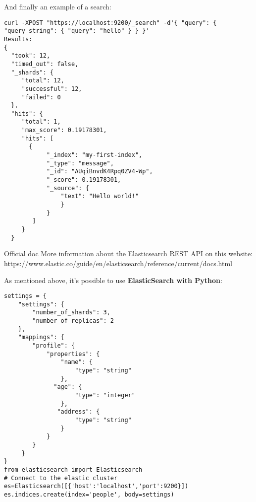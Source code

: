 \documentclass{beamer}[10pt, usepdftitle=false handout]
\begin{document}
\begin{frame}[fragile]
And finally an example of a search:
\vspace*{0.6em}

\begingroup
\fontsize{6pt}{6pt}\selectfont
\begin{verbatim}
curl -XPOST "https://localhost:9200/_search" -d'{ "query": { "query_string": { "query": "hello" } } }'  
Results:
{
  "took": 12,
  "timed_out": false,
  "_shards": {
     "total": 12,
     "successful": 12,
     "failed": 0
  },
  "hits": {
     "total": 1,
     "max_score": 0.19178301,
     "hits": [
       {
            "_index": "my-first-index",
            "_type": "message",
            "_id": "AUqiBnvdK4Rpq0ZV4-Wp",
            "_score": 0.19178301,
            "_source": {
                "text": "Hello world!"
                }
            }
        ]
     }
  }
\end{verbatim}
\endgroup
\begin{block}{Official doc}
More information about the Elasticsearch REST API on this website:
https://www.elastic.co/guide/en/elasticsearch/reference/current/docs.html
\end{block}
\end{frame}
\begin{frame}[fragile]
As mentioned above, it's possible to use \textbf{ElasticSearch with Python}:
\vspace*{0.6em}

\begingroup
\fontsize{6pt}{8pt}\selectfont
\begin{verbatim}
settings = {
    "settings": {
        "number_of_shards": 3,
        "number_of_replicas": 2
    },
    "mappings": {
        "profile": {
            "properties": {
                "name": {
                    "type": "string"
                },
	          "age": {
                    "type": "integer"
                },
    		   "address": {
                    "type": "string"
                }
            }
        }
     }
}
from elasticsearch import Elasticsearch 
# Connect to the elastic cluster
es=Elasticsearch([{'host':'localhost','port':9200}])
es.indices.create(index='people', body=settings)
\end{verbatim}
\endgroup
\end{frame}
\end{document}
